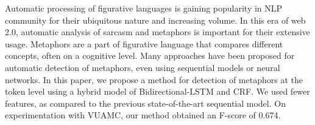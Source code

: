 Automatic processing of figurative languages is gaining popularity in NLP community for their ubiquitous nature and increasing volume. In this era of web 2.0, automatic analysis of sarcasm and metaphors is important for their extensive usage. Metaphors are a part of figurative language that compares different concepts, often on a cognitive level. Many approaches have been proposed for automatic detection of metaphors, even using sequential models or neural networks. In this paper, we propose a method for detection of metaphors at the token level using a hybrid model of Bidirectional-LSTM and CRF. We used fewer features, as compared to the previous state-of-the-art sequential model. On experimentation with VUAMC, our method obtained an F-score of 0.674.
